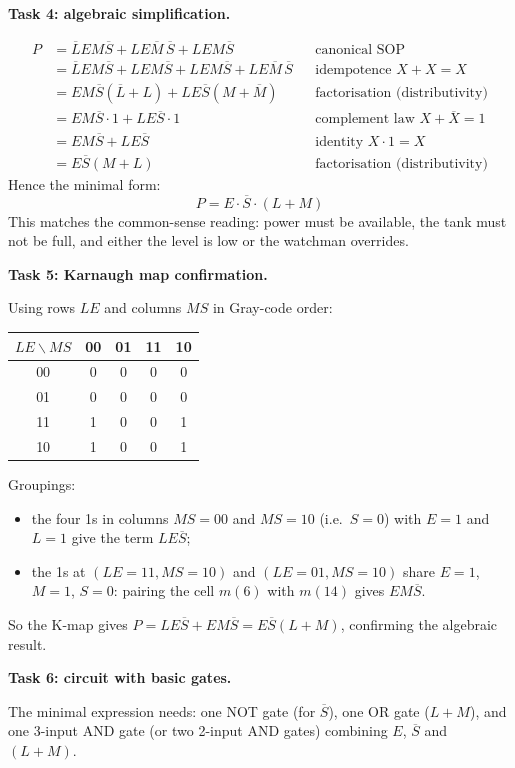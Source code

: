 \documentclass[11pt]{article}
\begin{document}
\textbf{Task 4: algebraic simplification.}\par
\begin{align*}
P &= \overline{L}EM\overline{S} + LE\overline{M}\,\overline{S} + LEM\overline{S} && \text{canonical SOP}\\
  &= \overline{L}EM\overline{S} + LEM\overline{S} + LEM\overline{S} + LE\overline{M}\,\overline{S} && \text{idempotence } X+X=X\\
  &= EM\overline{S}(\overline{L}+L) + LE\overline{S}(M+\overline{M}) && \text{factorisation (distributivity)}\\
  &= EM\overline{S}\cdot 1 + LE\overline{S}\cdot 1 && \text{complement law } X+\overline{X}=1\\
  &= EM\overline{S} + LE\overline{S} && \text{identity } X\cdot 1 = X\\
  &= E\overline{S}(M+L) && \text{factorisation (distributivity)}
\end{align*}
Hence the minimal form:
\[ \boxed{P = E\cdot\overline{S}\cdot(L+M)} \]
This matches the common-sense reading: power must be available, the tank must not be full, and either the level is low or the watchman overrides.

\textbf{Task 5: Karnaugh map confirmation.}\par
Using rows $LE$ and columns $MS$ in Gray-code order:
\begin{center}
\begin{tabular}{|c|cccc|}
\hline
\rowcolor{popblueL} $LE\backslash MS$ & 00 & 01 & 11 & 10 \\
\hline
00 & 0 & 0 & 0 & 0 \\
01 & 0 & 0 & 0 & 0 \\
11 & 1 & 0 & 0 & 1 \\
10 & 1 & 0 & 0 & 1 \\
\hline
\end{tabular}
\end{center}
Groupings:
\begin{itemize}
\item the four 1s in columns $MS=00$ and $MS=10$ (i.e.\ $S=0$) with $E=1$ and $L=1$ give the term $LE\overline{S}$;
\item the 1s at $(LE=11, MS=10)$ and $(LE=01, MS=10)$ share $E=1$, $M=1$, $S=0$: pairing the cell $m(6)$ with $m(14)$ gives $EM\overline{S}$.
\end{itemize}
So the K-map gives $P = LE\overline{S} + EM\overline{S} = E\overline{S}(L+M)$, confirming the algebraic result.

\textbf{Task 6: circuit with basic gates.}\par
The minimal expression needs: one NOT gate (for $\overline{S}$), one OR gate ($L+M$), and one 3-input AND gate (or two 2-input AND gates) combining $E$, $\overline{S}$ and $(L+M)$.
\end{document}
